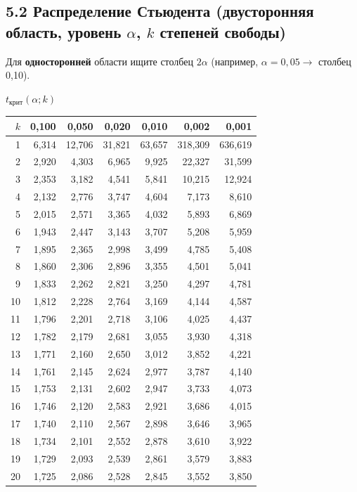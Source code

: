 \documentclass[a4paper,10pt]{extarticle}
\newcommand{\kr}{\text{крит}}\newcommand{\nab}{\text{набл}}
\begin{document}
\subsection*{5.2 Распределение Стьюдента (двусторонняя область, уровень $\alpha$, $k$ степеней свободы)}
Для \textbf{односторонней} области ищите столбец $2\alpha$ (например, $\alpha=0{,}05\to$ столбец 0,10).\\[2pt]
\scriptsize\renewcommand{\arraystretch}{0.88}\setlength{\tabcolsep}{4pt}
\begin{minipage}[t]{0.47\textwidth}\centering
\textbf{$t_\kr(\alpha;k)$}\\[2pt]
\begin{tabular}{r|rrrrrr}
$k$ & 0,100 & 0,050 & 0,020 & 0,010 & 0,002 & 0,001\\\hline
1 & 6,314 & 12,706 & 31,821 & 63,657 & 318,309 & 636,619\\
2 & 2,920 & 4,303 & 6,965 & 9,925 & 22,327 & 31,599\\
3 & 2,353 & 3,182 & 4,541 & 5,841 & 10,215 & 12,924\\
4 & 2,132 & 2,776 & 3,747 & 4,604 & 7,173 & 8,610\\
5 & 2,015 & 2,571 & 3,365 & 4,032 & 5,893 & 6,869\\
6 & 1,943 & 2,447 & 3,143 & 3,707 & 5,208 & 5,959\\
7 & 1,895 & 2,365 & 2,998 & 3,499 & 4,785 & 5,408\\
8 & 1,860 & 2,306 & 2,896 & 3,355 & 4,501 & 5,041\\
9 & 1,833 & 2,262 & 2,821 & 3,250 & 4,297 & 4,781\\
10 & 1,812 & 2,228 & 2,764 & 3,169 & 4,144 & 4,587\\
11 & 1,796 & 2,201 & 2,718 & 3,106 & 4,025 & 4,437\\
12 & 1,782 & 2,179 & 2,681 & 3,055 & 3,930 & 4,318\\
13 & 1,771 & 2,160 & 2,650 & 3,012 & 3,852 & 4,221\\
14 & 1,761 & 2,145 & 2,624 & 2,977 & 3,787 & 4,140\\
15 & 1,753 & 2,131 & 2,602 & 2,947 & 3,733 & 4,073\\
16 & 1,746 & 2,120 & 2,583 & 2,921 & 3,686 & 4,015\\
17 & 1,740 & 2,110 & 2,567 & 2,898 & 3,646 & 3,965\\
18 & 1,734 & 2,101 & 2,552 & 2,878 & 3,610 & 3,922\\
19 & 1,729 & 2,093 & 2,539 & 2,861 & 3,579 & 3,883\\
20 & 1,725 & 2,086 & 2,528 & 2,845 & 3,552 & 3,850\\

\end{tabular}
\end{minipage}
\end{document}
